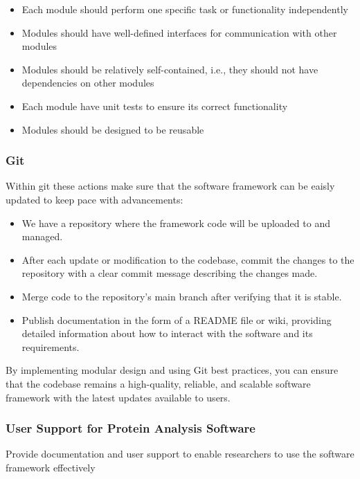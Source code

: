 \documentclass[]{final_report}
\begin{document}
\begin{itemize}
    \item Each module should perform one specific task or functionality independently
    \item Modules should have well-defined interfaces for communication with other modules
    \item Modules should be relatively self-contained, i.e., they should not have dependencies on other modules
    \item Each module have unit tests to ensure its correct functionality
    \item Modules should be designed to be reusable
\end{itemize}


\subsubsection{Git}
Within git these actions make sure that the software framework can be eaisly updated to keep pace with advancements:

\begin{itemize}
    \item We have a repository where the framework code will be uploaded to and managed.
    \item After each update or modification to the codebase, commit the changes to the repository with a clear commit message describing the changes made.
    \item Merge code to the repository's main branch after verifying that it is stable.
    \item Publish documentation in the form of a README file or wiki, providing detailed information about how to interact with the software and its requirements.
\end{itemize}

By implementing modular design and using Git best practices, you can ensure that the codebase remains a high-quality, reliable, and scalable software framework with the latest updates available to users.

\clearpage

\subsubsection{User Support for Protein Analysis Software}
\begin{displayquote}
    Provide documentation and user support to enable researchers to use the software
    framework effectively
\end{displayquote}
\end{document}
